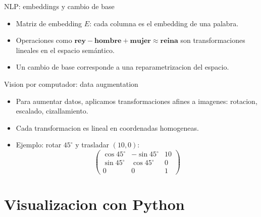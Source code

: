 \documentclass[aspectratio=169, 10pt, xcolor=table]{beamer}
\begin{document}
\begin{frame}{NLP: embeddings y cambio de base}
    \begin{itemize}
        \item Matriz de embedding $E$: cada columna es el embedding de una palabra.
        \item Operaciones como $\mathbf{rey} - \mathbf{hombre} + \mathbf{mujer} \approx \mathbf{reina}$ son transformaciones lineales en el espacio semántico.
        \item Un cambio de base corresponde a una reparametrizacion del espacio.
    \end{itemize}
\end{frame}

\begin{frame}{Vision por computador: data augmentation}
    \begin{itemize}
        \item Para aumentar datos, aplicamos transformaciones afines a imagenes: rotacion, escalado, cizallamiento.
        \item Cada transformacion es lineal en coordenadas homogeneas.
        \item Ejemplo: rotar $45^\circ$ y trasladar $(10,0)$:
        \[
        \begin{pmatrix}\cos45^\circ&-\sin45^\circ&10\\ \sin45^\circ&\cos45^\circ&0\\0&0&1\end{pmatrix}
        \]
    \end{itemize}
\end{frame}

\section{Visualizacion con Python}
\end{document}
